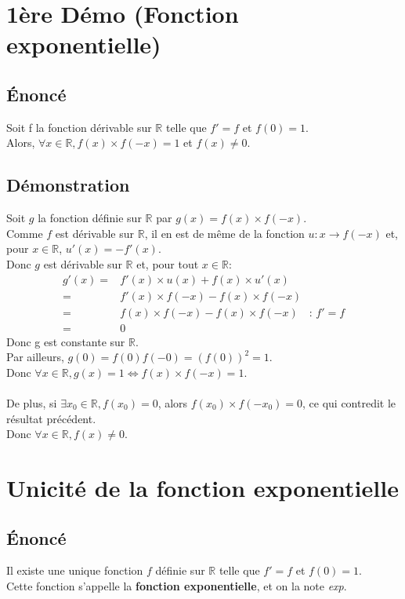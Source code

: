 \documentclass[12px]{article}
\begin{document}
	\section{1ère Démo (Fonction exponentielle)}
		
	\subsection{\'Enoncé}
	Soit f la fonction dérivable sur $\mathbb{R}$ telle que $f'=f$ et $f(0)=1$.\\
	Alors, $\forall x\in\mathbb{R}, f(x)\times f(-x)=1$ et $f(x)\not= 0$.
		
	\subsection{Démonstration}
	Soit $g$ la fonction définie sur $\mathbb{R}$ par $g(x)=f(x)\times f(-x)$.\\
	Comme $f$ est dérivable sur $\mathbb{R}$, il en est de même de la fonction $u:x\rightarrow f(-x)$ et, pour $x\in\mathbb{R}$, $u'(x)=-f'(x)$.\\
	Donc $g$ est dérivable sur $\mathbb{R}$ et, pour tout $x\in\mathbb{R}$:
	\begin{align*}
		g'(x)=&f'(x)\times u(x) + f(x)\times u'(x)\\
			 =&f'(x)\times f(-x) - f(x)\times f(-x)\\
			 =&f(x)\times f(-x) - f(x)\times f(-x)\quad :\, f'=f\\
			 =&0
	\end{align*}
	Donc g est constante sur $\mathbb{R}$.\\
	Par ailleurs, $g(0)=f(0)f(-0)=(f(0))^2=1$.\\
	Donc $\forall x\in \mathbb{R}, g(x)=1 \Leftrightarrow f(x)\times f(-x)=1$.\\
	\\
	De plus, si $\exists x_0\in\mathbb{R}, f(x_0)=0$, alors $f(x_0)\times f(-x_0)=0$, ce qui contredit le résultat précédent.\\
	Donc $\forall x\in\mathbb{R}, f(x)\not=0$.
	
	
	\newpage
	\section{Unicité de la fonction exponentielle}
	
	\subsection{\'Enoncé}
	Il existe une unique fonction $f$ définie sur $\mathbb{R}$ telle que $f'=f$ et $f(0)=1$.\\
	Cette fonction s'appelle la \textbf{fonction exponentielle}, et on la note \emph{exp}.
	
\end{document}
